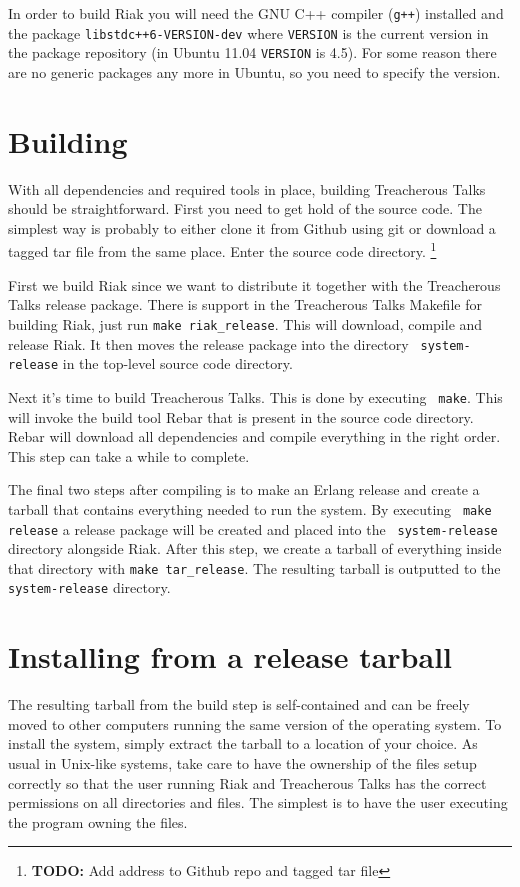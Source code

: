 \documentclass[11pt,a4paper]{report}
\newcommand{\todo}[1]{\footnote{{\color{red} {\bf TODO:} #1}}}
\begin{document}
In order to build Riak you will need the GNU C++ compiler ({\tt g++}) installed
and the package {\tt libstdc++6-VERSION-dev} where {\tt VERSION} is the current
version in the package repository (in Ubuntu 11.04 {\tt VERSION} is 4.5). For
some reason there are no generic packages any more in Ubuntu, so you need to
specify the version.
\section{Building}
With all dependencies and required tools in place, building Treacherous Talks
should be straightforward. First you need to get hold of the source code. The
simplest way is probably to either clone it from Github using git or download a
tagged tar file from the same place. Enter the source code directory.
\todo{Add address to Github repo and tagged tar file}

First we build Riak since we want to distribute it together with the Treacherous
Talks release package. There is support in the Treacherous Talks Makefile for
building Riak, just run {\tt make riak\_release}. This will download, compile
and release Riak. It then moves the release package into the directory {\tt
  system-release} in the top-level source code directory.

Next it's time to build Treacherous Talks. This is done by executing {\tt
  make}. This will invoke the build tool Rebar that is present in the source
code directory. Rebar will download all dependencies and compile everything in
the right order. This step can take a while to complete.

The final two steps after compiling is to make an Erlang release and create a
tarball that contains everything needed to run the system. By executing {\tt
  make release} a release package will be created and placed into the {\tt
  system-release} directory alongside Riak. After this step, we create a tarball
of everything inside that directory with {\tt make tar\_release}. The resulting
tarball is outputted to the {\tt system-release} directory.
\section{Installing from a release tarball}
\label{sec:installing}
The resulting tarball from the build step is self-contained and can be freely
moved to other computers running the same version of the operating system. To
install the system, simply extract the tarball to a location of your choice. As
usual in Unix-like systems, take care to have the ownership of the files setup
correctly so that the user running Riak and Treacherous Talks has the correct
permissions on all directories and files. The simplest is to have the user
executing the program owning the files.
\end{document}
